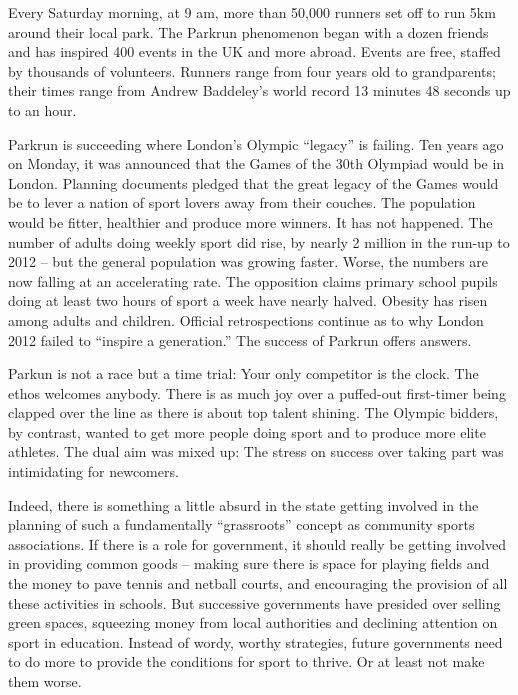 Every Saturday morning, at 9 am, more than 50,000 runners set off to run 5km around their local park. The Parkrun phenomenon began with a dozen friends and has inspired 400 events in the UK and more abroad. Events are free, staffed by thousands of volunteers. Runners range from four years old to grandparents; their times range from Andrew Baddeley's world record 13 minutes 48 seconds up to an hour.


Parkrun is succeeding where London's Olympic ``legacy'' is failing. Ten years ago on Monday, it was announced that the Games of the 30th Olympiad would be in London. Planning documents pledged that the great legacy of the Games would be to lever a nation of sport lovers away from their couches. The population would be fitter, healthier and produce more winners. It has not happened. The number of adults doing weekly sport did rise, by nearly 2 million in the run-up to 2012 – but the general population was growing faster. Worse, the numbers are now falling at an accelerating rate. The opposition claims primary school pupils doing at least two hours of sport a week have nearly halved. Obesity has risen among adults and children. Official retrospections continue as to why London 2012 failed to ``inspire a generation.'' The success of Parkrun offers answers.


Parkun is not a race but a time trial: Your only competitor is the clock. The ethos welcomes anybody. There is as much joy over a puffed-out first-timer being clapped over the line as there is about top talent shining. The Olympic bidders, by contrast, wanted to get more people doing sport and to produce more elite athletes. The dual aim was mixed up: The stress on success over taking part was intimidating for newcomers.


Indeed, there is something a little absurd in the state getting involved in the planning of such a fundamentally ``grassroots'' concept as community sports associations. If there is a role for government, it should really be getting involved in providing common goods – making sure there is space for playing fields and the money to pave tennis and netball courts, and encouraging the provision of all these activities in schools. But successive governments have presided over selling green spaces, squeezing money from local authorities and declining attention on sport in education. Instead of wordy, worthy strategies, future governments need to do more to provide the conditions for sport to thrive. Or at least not make them worse.